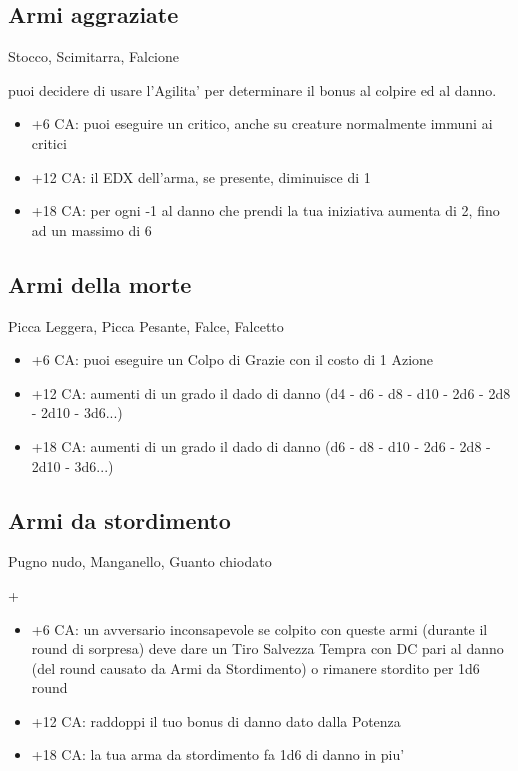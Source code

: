 \documentclass[a4paper,11pt,twoside,openany]{dndbook}
\begin{document}
\subsection{Armi aggraziate} Stocco, Scimitarra, Falcione

puoi decidere di usare l'Agilita' per determinare il bonus al colpire
ed al danno.

\begin{itemize}
	\item +6 CA: puoi eseguire un critico, anche su creature normalmente immuni
ai critici

\item +12 CA: il EDX dell'arma, se presente, diminuisce di 1

\item +18 CA: per ogni -1 al danno che prendi la tua iniziativa aumenta di 2, fino ad un massimo di 6
\end{itemize}

\subsection{Armi della morte} Picca Leggera, Picca Pesante, Falce, Falcetto

\begin{itemize}
	\item +6 CA: puoi eseguire un Colpo di Grazie con il costo di 1 Azione

\item +12 CA: aumenti di un grado il dado di danno (d4 - d6 - d8 - d10 - 2d6 - 2d8 - 2d10 - 3d6...)

\item +18 CA: aumenti di un grado il dado di danno (d6 - d8 - d10 - 2d6 - 2d8 - 2d10 - 3d6...)

\end{itemize}

\subsection{Armi da stordimento} Pugno nudo, Manganello, Guanto chiodato

+\begin{itemize}
\item +6 CA: un avversario inconsapevole se colpito con queste armi (durante il round di sorpresa) deve dare un Tiro Salvezza Tempra con DC pari al danno (del round causato da Armi da Stordimento) o rimanere stordito per 1d6 round

\item +12 CA: raddoppi il tuo bonus di danno dato dalla Potenza

\item +18 CA: la tua arma da stordimento fa 1d6 di danno in piu'
\end{itemize}
\end{document}
